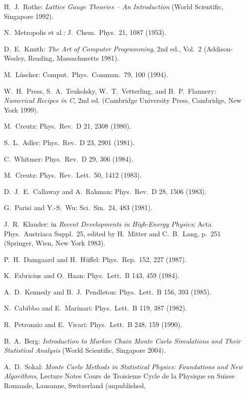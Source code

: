 \begin{enumerate}[label={[\arabic*]}]
  \item H.~J.~Rothe: \emph{Lattice Gauge Theories -- An Introduction} (World
        Scientific, Singapore 1992).
  \item N.~Metropolis et al.: J.~Chem.~Phys.~21, 1087 (1953).
  \item D.~E.~Knuth: \emph{The Art of Computer Programming}, 2nd ed., Vol.~2
        (Addison-Wesley, Reading, Massachusetts 1981).
  \item M.~L\"uscher: Comput.~Phys.~Commun.~79, 100 (1994).
  \item W.~H.~Press, S.~A.~Teukolsky, W.~T.~Vetterling, and B.~P.~Flannery:
        \emph{Numerical Recipes in C}, 2nd ed. (Cambridge University Press,
        Cambridge, New York 1999).
  \item M.~Creutz: Phys.~Rev.~D 21, 2308 (1980).
  \item S.~L.~Adler: Phys.~Rev.~D 23, 2901 (1981).
  \item C.~Whitmer: Phys.~Rev.~D 29, 306 (1984).
  \item M.~Creutz: Phys.~Rev.~Lett.~50, 1412 (1983).
  \item D.~J.~E.~Callaway and A.~Rahman: Phys.~Rev.~D 28, 1506 (1983).
  \item G.~Parisi and Y.-S.~Wu: Sci.~Sin.~24, 483 (1981).
  \item J.~R.~Klauder: in \emph{Recent Developments in High-Energy Physics};
        Acta Phys.~Austriaca Suppl.~25, edited by H.~Mitter and C.~B.~Lang,
        p.~251 (Springer, Wien, New York 1983).
  \item P.~H.~Damgaard and H.~H\"uffel: Phys.~Rep.~152, 227 (1987).
  \item K.~Fabricius and O.~Haan: Phys.~Lett.~B 143, 459 (1984).
  \item A.~D.~Kennedy and B.~J.~Pendleton: Phys.~Lett.~B 156, 393 (1985).
  \item N.~Cabibbo and E.~Marinari: Phys.~Lett.~B 119, 387 (1982).
  \item R.~Petronzio and E.~Vicari: Phys.~Lett.~B 248, 159 (1990).
  \item B.~A.~Berg: \emph{Introduction to Markov Chain Monte Carlo Simulations and
        Their Statistical Analysis} (World Scientific, Singapore 2004).
  \item A.~D.~Sokal: \emph{Monte Carlo Methods in Statistical Physics: Foundations
        and New Algorithms}, Lecture Notes Cours de Troisieme Cycle de la
        Physique en Suisse Romande, Lausanne, Switzerland (unpublished,

\end{enumerate}
